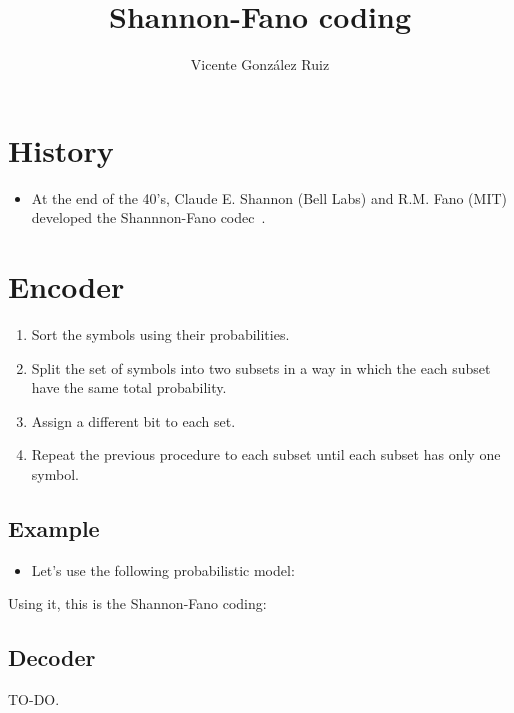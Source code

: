 \title{Shannon-Fano coding}
\author{Vicente González Ruiz}
\maketitle
\tableofcontents

\section{History}
\begin{itemize}
\tightlist
\item
  At the end of the 40's, Claude E. Shannon (Bell Labs) and R.M. Fano
  (MIT) developed the Shannnon-Fano codec~\cite{fano1949transmission,
    shannon1948mathematical}.
\end{itemize}

\section{Encoder}
\begin{enumerate}
\tightlist
\item
  Sort the symbols using their probabilities.
\item
  Split the set of symbols into two subsets in a way in which the each
  subset have the same total probability.
\item
  Assign a different bit to each set.
\item
  Repeat the previous procedure to each subset until each subset has
  only one symbol.
\end{enumerate}

\subsection{Example}
\begin{itemize}
\tightlist
\item
  Let's use the following probabilistic model:
\end{itemize}


Using it, this is the Shannon-Fano coding:


\subsection{Decoder}
TO-DO.


